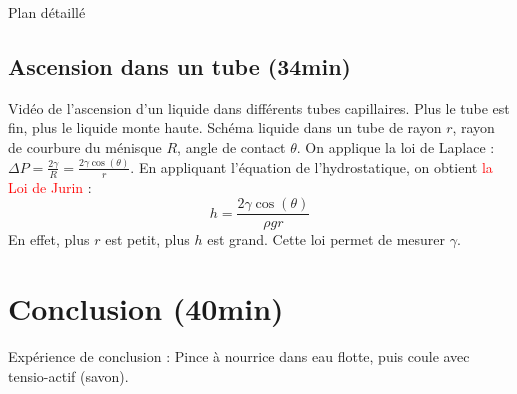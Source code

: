 \begin{reportBlock}{Plan détaillé}
  \subsection{Ascension dans un tube (34min)}
  Vidéo de l'ascension d'un liquide dans différents tubes capillaires. Plus le tube est fin, plus le liquide monte haute.
  Schéma liquide dans un tube de rayon $r$, rayon de courbure du ménisque $R$, angle de contact $\theta$. On applique la loi de Laplace : $\Delta P = \frac{2\gamma}{R}=\frac{2\gamma\cos(\theta)}{r}$. En appliquant l'équation de l'hydrostatique, on obtient \textcolor{red}{la Loi de Jurin} :
  \begin{equation}
      h = \frac{2\gamma\cos(\theta)}{\rho g r}
  \end{equation}
  En effet, plus $r$ est petit, plus $h$ est grand. Cette loi permet de mesurer $\gamma$.
  
  \section*{Conclusion (40min)}
  Expérience de conclusion : Pince à nourrice dans eau flotte, puis coule avec tensio-actif (savon).



\end{reportBlock}


